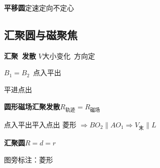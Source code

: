\textbf{平移圆}\quad 定速定向不定心


\subsection{汇聚圆与磁聚焦}
\textbf{汇聚\ 发散}
$V$大小变化\ 方向定

$B_1=B_2$\ 点入平出

平进点出

\textbf{圆形磁场汇聚发散}\quad $R_{\text{轨迹}}=R_{\text{磁场}}$

点入平出\quad 平入点出
菱形 $\Rightarrow BO_2\parallel AO_1\Rightarrow V_{\text{末}}\parallel L$

\textbf{汇聚圆}\quad $R=d=r$


图旁标注：菱形

